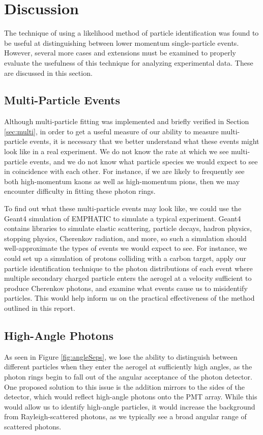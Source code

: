 
\chapter{Discussion}
\label{ch:Discussion}

The technique of using a likelihood method of  particle identification was found to be useful at distinguishing between lower momentum single-particle events.
However, several more cases and extensions must be examined to properly evaluate the usefulness of this technique for analyzing experimental data. 
These are discussed in this section. 

\section{Multi-Particle Events}
Although multi-particle fitting was implemented and briefly verified in Section \ref{sec:multi}, in order to get a useful measure of our ability to measure multi-particle events, it is necessary that we better understand what these events might look like in a real experiment.
We do not know the rate at which we see multi-particle events, and we do not know what particle species we would expect to see in coincidence with each other.
For instance, if we are likely to frequently see both high-momentum kaons as well as high-momentum pions, then we may encounter difficulty in fitting these photon rings.

To find out what these multi-particle events may look like, we could use the Geant4 simulation of EMPHATIC to simulate a typical experiment.
Geant4 contains libraries to simulate elastic scattering, particle decays, hadron physics, stopping physics, Cherenkov radiation, and more, so such a simulation should well-approximate the types of events we would expect to see.
For instance, we could set up a simulation of protons colliding with a carbon target, apply our particle identification technique to the photon distributions of each event where multiple secondary charged particle enters the aerogel at a velocity sufficient to produce Cherenkov photons, and examine what events cause us to misidentify particles.
This would help inform us on the practical effectiveness of the method outlined in this report.

\section{High-Angle Photons}
As seen in Figure \ref{fig:angleSeps}, we lose the ability to distinguish between different particles when they enter the aerogel at sufficiently high angles, as the photon rings begin to fall out of the angular acceptance of the photon detector.
One proposed solution to this issue is the addition mirrors to the sides of the detector, which would reflect high-angle photons onto the PMT array. 
While this would allow us to identify high-angle particles, it would increase the background from Rayleigh-scattered photons, as we typically see a broad angular range of scattered photons.

